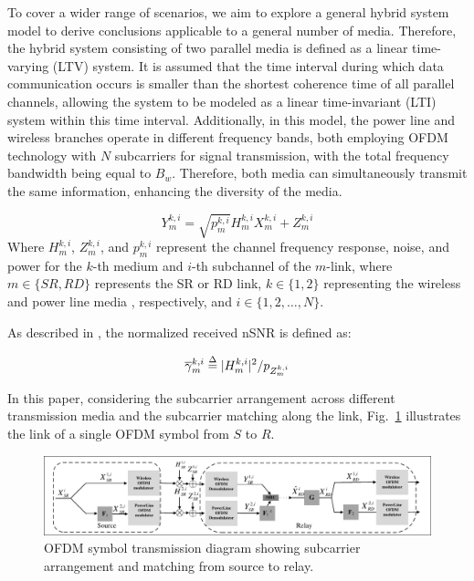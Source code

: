 \documentclass[lettersize,journal]{IEEEtran}
\begin{document}
	To cover a wider range of scenarios, we aim to explore a general hybrid system model to derive conclusions applicable to a general number of media. Therefore, the hybrid system consisting of two parallel media is defined as a linear time-varying (LTV) system. It is assumed that the time interval during which data communication occurs is smaller than the shortest coherence time of all parallel channels, allowing the system to be modeled as a linear time-invariant (LTI) system within this time interval. Additionally, in this model, the power line and wireless branches operate in different frequency bands, both employing OFDM technology with \( N \) subcarriers for signal transmission, with the total frequency bandwidth being equal to \( B_w \). Therefore, both media can simultaneously transmit the same information, enhancing the diversity of the media.

	\begin{equation}		
		Y_m^{k,i} = \sqrt {p_m^{k,i}} H_m^{k,i}X_m^{k,i} + Z_m^{k,i}
	\end{equation}
	Where \( H_m^{k,i} \), \( Z_m^{k,i} \), and \( p_m^{k,i} \) represent the channel frequency response, noise, and power for the \( k \)-th medium and \( i \)-th subchannel of the \( m \)-link, where \( m \in \{SR, RD\} \) represents the SR or RD link, \( k \in \{1, 2\} \) representing the wireless and power line media , respectively, and \( i \in \{1, 2, \dots, N\} \).
	
	As described in \cite{9122404}, the normalized received nSNR is defined as:
	
	\begin{equation}
		\overline \gamma  _m^{k,i} \buildrel \Delta \over = |H_m^{k,i}{|^2}/{p_{Z_m^{k,i}}}
	\end{equation}
	
	In this paper, considering the subcarrier arrangement across different transmission media and the subcarrier matching along the link, Fig.~\ref{fig:SR} illustrates the link of a single OFDM symbol from \( S \) to \( R \).
	
	\begin{figure}[htbp]
		\centering
		\includegraphics[width=\linewidth, trim=10 1 10 1, clip]{fig2.pdf}
		\caption{OFDM symbol transmission diagram showing subcarrier arrangement and matching from source to relay.}
		\label{fig:SR}
	\end{figure}
	
\end{document}
